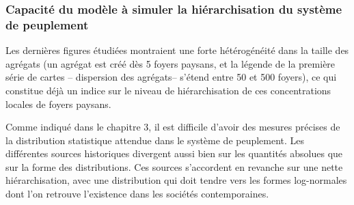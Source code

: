 \clearpage
\subsubsection{Capacité du modèle à simuler la hiérarchisation du système de peuplement}

Les dernières figures étudiées montraient une forte hétérogénéité dans la taille des agrégats (un agrégat est créé dès 5 foyers paysans, et la légende de la première série de cartes -- dispersion des agrégats-- s'étend entre 50 et 500 foyers), ce qui constitue déjà un indice sur le niveau de hiérarchisation de ces concentrations locales de foyers paysans.

Comme indiqué dans le chapitre 3, il est difficile d'avoir des mesures précises de la distribution statistique attendue dans le système de peuplement.
Les différentes sources historiques divergent aussi bien sur les quantités absolues que sur la forme des distributions.
Ces sources s'accordent en revanche sur une nette hiérarchisation, avec une distribution qui doit tendre vers les formes log-normales dont l'on retrouve l'existence dans les sociétés contemporaines.


